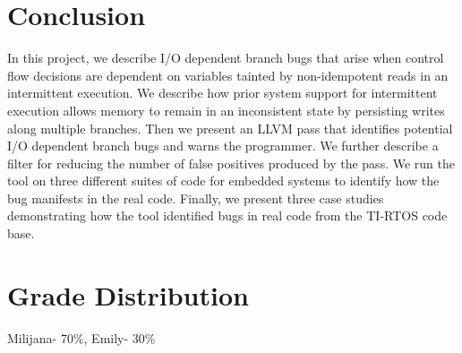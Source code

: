 \section{Conclusion}
In this project, we describe I/O dependent branch bugs that arise when control
flow decisions are dependent on variables tainted by non-idempotent reads in an
intermittent execution.
%
We describe how prior system support for intermittent execution allows
memory to remain in an inconsistent state by persisting writes along multiple
branches. Then we present an LLVM pass that identifies potential I/O dependent
branch bugs and warns the programmer. We further describe a filter for reducing the
number of false positives produced by the pass.
%
We run the tool on three different suites of code for embedded systems
to identify how the bug manifests in the real code. Finally, we present three
case studies demonstrating how the tool identified bugs in real code from the
TI-RTOS code base.

\section{Grade Distribution}
Milijana- 70\%, Emily- 30\%

